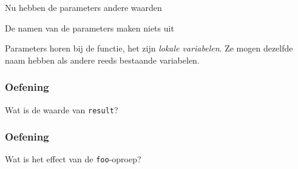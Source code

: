 {\begin{frame}
\begin{overprint}
    \begin{center}
      Nu hebben de parameters andere waarden
    \end{center}

    \begin{center}
      De namen van de parameters maken niets uit
    \end{center}

    \begin{center}
      Parameters horen bij de functie, het zijn \emph{lokale variabelen}.
      Ze mogen dezelfde naam hebben als andere reeds bestaande variabelen.
    \end{center}
  \end{overprint}
\end{frame}
}

\begin{frame}
  \frametitle{Oefening}
  \begin{center}
     Wat is de waarde van {\tt result}? 
  \end{center}
\end{frame}

\begin{frame}
  \frametitle{Oefening}
  \begin{center}
    Wat is het effect van de {\tt foo}-oproep? \\
  \end{center}
\end{frame}

